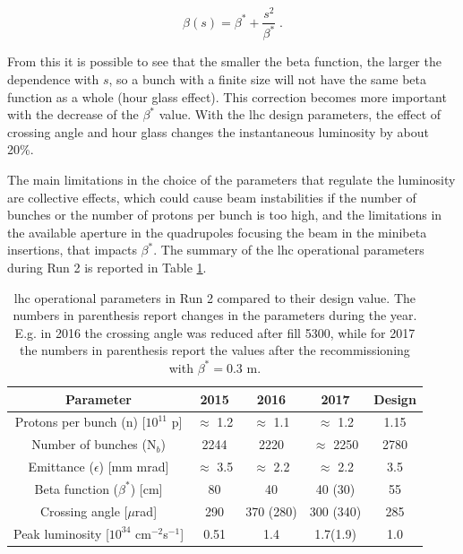 \begin{equation}
\beta(s) = \beta^* + \frac{s^2}{\beta^*} \; .
\end{equation}

From this it is possible to see that the smaller the beta function, the larger the dependence with $s$, so a bunch with a finite size will not have the same beta function as a whole (hour glass effect). This correction becomes more important with the decrease of the $\beta^*$ value. With the \gls{lhc} design parameters, the effect of crossing angle and hour glass changes the instantaneous luminosity by about 20\%.

The main limitations in the choice of the parameters that regulate the luminosity are collective effects, which could cause beam instabilities if the number of bunches or the number of protons per bunch is too high, and the limitations in the available aperture in the
quadrupoles focusing the beam in the minibeta insertions, that impacts $\beta^*$. The summary of the \gls{lhc} operational parameters during Run 2 is reported in Table \ref{tab:lhc:param}.


\begin{table}[ht]
\begin{center}
\begin{tabular}{c c c c c }
\hline 
Parameter & 2015 & 2016 & 2017 & Design \\ 
\hline 
\hline
Protons per bunch (n) [$10^{11}$ p] & $\approx$ 1.2 & $\approx$ 1.1 & $\approx$ 1.2 & 1.15 \\ 
\hline 
Number of bunches (N$_b$) & 2244 & 2220 & $\approx$ 2250 & 2780 \\ 
\hline 
Emittance ($\epsilon$) [mm mrad] & $\approx$ 3.5 & $\approx$ 2.2 & $\approx$ 2.2 & 3.5 \\ 
\hline 
Beta function ($\beta^*$) [cm] & 80 & 40 & 40 (30) & 55 \\
\hline
Crossing angle [$\mu$rad] & 290 & 370 (280) & 300 (340) & 285 \\
\hline
Peak luminosity [$10^{34}$ cm$^{-2}$s$^{-1}$] & 0.51 & 1.4 & 1.7(1.9) & 1.0 \\
\hline
\end{tabular}
\end{center}
\caption{\gls{lhc} operational parameters in Run 2 compared to their design value.
The numbers in parenthesis report changes in the parameters during the year. 
E.g. in 2016 the crossing angle was reduced after fill 5300,
while for 2017 the numbers in parenthesis report the values 
after the recommissioning with $\beta^* = 0.3$ m.}
\label{tab:lhc:param}
\end{table}



